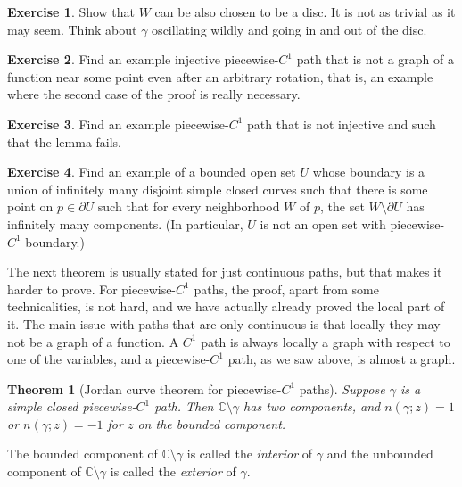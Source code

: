 \documentclass[12pt,openany]{book}
\newcommand{\C}{{\mathbb{C}}}
\theoremstyle{plain}
\newtheorem{thm}{Theorem}[section]
\theoremstyle{remark}
\theoremstyle{definition}
\newenvironment{exbox}{%
    \def\FrameCommand{\vrule width 1pt \relax\hspace{10pt}}%
    \MakeFramed{\advance\hsize-\width\FrameRestore}%
}{%
    \endMakeFramed
}
\theoremstyle{exercise}
\newtheorem{exercise}{Exercise}[section]
\theoremstyle{example}
\begin{document}
\begin{exbox}
\begin{exercise}
Show that $W$ can be also chosen to be a disc.
It is not as trivial as it may seem.
Think about $\gamma$ oscillating wildly and going in and out of the disc.
\end{exercise}

\begin{exercise}
Find an example injective piecewise-$C^1$ path that is not a graph of a
function near some point even after an arbitrary rotation,
that is, an example where the second case of the
proof is really necessary.
\end{exercise}

\begin{exercise}
Find an example piecewise-$C^1$ path that is not injective and such that
the lemma fails.
\end{exercise}

\begin{exercise}
Find an example of a bounded open set $U$ whose boundary is a union of
infinitely many disjoint simple closed curves such that there is some point
on $p \in \partial U$ such that for every neighborhood $W$ of $p$,
the set $W \setminus \partial U$ has infinitely many components.
(In particular, $U$ is not an open set with piecewise-$C^1$ boundary.)
\end{exercise}
\end{exbox}

The next theorem is usually stated for just continuous paths, but that makes
it harder to prove.  For piecewise-$C^1$ paths, the proof, apart from some
technicalities, is not hard, and we have actually already proved the
local part of it.  The main issue with paths that are only continuous is that
locally they may not be a graph of a function.  A $C^1$ path is always
locally a graph with respect to one of the variables, and a piecewise-$C^1$
path, as we saw above, is almost a graph.

\begin{thm}[Jordan curve theorem for piecewise-$C^1$ paths]%
Suppose $\gamma$ is a simple closed piecewise-$C^1$ path.
Then $\C \setminus \gamma$ has two components,
and $n(\gamma;z) = 1$ or 
$n(\gamma;z) = -1$ for $z$ on the bounded component.
\end{thm}

The bounded component of $\C \setminus \gamma$ is called the
\emph{interior} of $\gamma$
and the unbounded component of $\C \setminus \gamma$ is called the
\emph{exterior} of $\gamma$.
\end{document}
